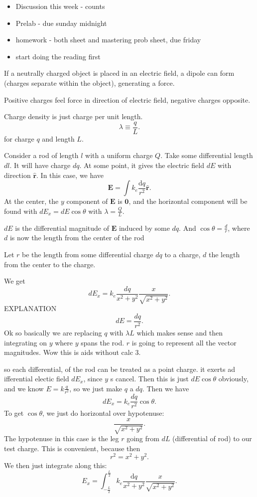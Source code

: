 
\begin{itemize}
	\item Discussion this week - counts
	\item Prelab - due sunday midnight
	\item homework - both sheet and mastering prob sheet, due friday
	\item start doing the reading first
\end{itemize}

If a neutrally charged object is placed in an electric field, a dipole can form (charges separate within the object), generating a force.

Positive charges feel force in direction of electric field, negative charges opposite.

\begin{definition}\label{dfn:17}
	Charge density is just charge per unit length.
	\[
		\lambda \equiv \frac{q}{L}
	.\]
	for charge $q$ and length $L$.
\end{definition}
Consider a rod of length $l$ with a uniform charge  $Q$. Take some differential length $dl$. It will have charge $dq$. At some point, it gives the electric field $dE$ with direction $\mathbf{\hat{r}}$.
In this case, we have
\[
	\mathbf{E}=\int k_e \frac{\mathrm{d} q}{r^2}\mathbf{\hat{r}}
.\]
At the center, the $y$ component of $\mathbf{E}$ is $\mathbf{0}$, and the horizontal component will be found with $dE_x = dE\cos\theta $ with $\lambda =\frac{Q}{L}$.

$dE$ is the differential magnitude of $\mathbf{E}$ induced by some $dq$. And $\cos \theta =\frac{d}{r}$, where $d$ is now the length from the center of the rod

Let $r$ be the length from some differential charge $dq$ to a charge, $d$ the length from the center to the charge.

We get
\[
	dE_x = k_e \frac{dq}{x^2 + y^2}\frac{x}{\sqrt{x^2 +y^2} }
.\]
EXPLANATION
\[
	dE=\frac{dq}{r^2}
.\]
Ok so basically we are replacing $q$ with $\lambda L$ which makes sense and then integrating on $y$ where $y$ spans the rod. $r$ is going to represent all the vector magnitudes. Wow this is aids without calc 3.

so each differential, of the rod can be treated as a point charge. it exerts ad ifferential electic field $dE_x$, since $y$ s cancel. Then this is just $dE\cos\theta $ obviously, and we know $E=k \frac{q}{r^2}$, so we just make $q$ a $dq$. Then we have
\[
	dE_x = k_e \frac{dq}{r^2}\cos\theta 
.\]
To get $\cos \theta $, we just do horizontal over hypotenuse:
\[
	\frac{x}{\sqrt{x^2+y^2} }
.\]
The hypotenuse in this case is the leg $r$ going from $dL$ (differential of rod) to our test charge. This is convenient, because then
\[
	r^2 = x^2+y^2
.\]
We then just integrate along this:
\[
	E_x = \int_{-\frac{L}{2}}^{\frac{L}{2}}k_e \frac{\mathrm{d} q}{x^2+y^2}\frac{x}{\sqrt{x^2+y^2} }
.\]

